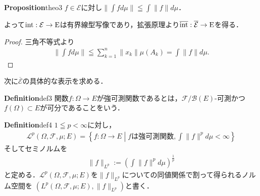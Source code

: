 \documentclass[dvipdfmx,autodetect-engine]{jbook}
\newcommand{\relmiddle}[1]{\mathrel{}\middle#1\mathrel{}}
\begin{document}
  \begin{mytheo}{\textbf{Proposition}}{theo3}
    $f\in \mathcal{E}$に対し$\|\int fd\mu\|\leqq\int\|f\|d\mu$．　\par
    よって$\rm{int}:\mathcal{E}\to E$は有界線型写像であり，拡張原理より$\rm{\overline{int}}:\mathcal{\overline{E}}\to E$を得る．
  \end{mytheo}
  \begin{proof}
    三角不等式より
    \begin{align*}
      \| \int f d\mu \| \leqq \sum_{k=1}^{n}\|x_k\|\mu\left(A_k\right) = \int \|f\| d\mu.
    \end{align*}
  \end{proof}
  次に$\mathcal{\overline{E}}$の具体的な表示を求める．

  \begin{mydef}{\textbf{Definition}}{def3}
    関数$f:\Omega \to E$が強可測関数であるとは，$\mathcal{F}/{\mathcal{B}\left(E \right)}$-可測かつ$f(\Omega)\subset E$が可分であることをいう．
  \end{mydef}

  \begin{mydef}{\textbf{Definition}}{def4}
    $1\leqq p < \infty$に対し，
    \begin{align*}
      \mathcal{L}^p \left( \Omega,\mathcal{F},\mu ; E \right) = \left\{ f:\Omega \to E \relmiddle| fは強可測関数 , \int \|f\|^p d\mu < \infty \right\}
    \end{align*}
    そしてセミノルムを
    \begin{align*}
      \|f\|_{L^p} := \left( \int \| f \|^p d\mu \right)^{\frac{1}{p}}
    \end{align*}
    と定める．$\mathcal{L}^p \left( \Omega,\mathcal{F},\mu ; E \right)$を$\|f\|_{L^p}$についての同値関係で割って得られるノルム空間を
    $\left(L^p \left( \Omega,\mathcal{F},\mu ; E \right), \|f\|_{L^p} \right)$と書く．
  \end{mydef}




\end{document}
